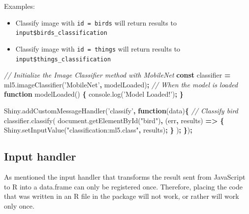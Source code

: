 \documentclass[10pt,]{krantz}
\makeatletter
\newenvironment{Shaded}{\begin{snugshade}}{\end{snugshade}}
\newcommand{\AttributeTok}[1]{\textcolor[rgb]{0.61,0.61,0.61}{#1}}
\newcommand{\CommentTok}[1]{\textcolor[rgb]{0.37,0.37,0.37}{\textit{#1}}}
\newcommand{\KeywordTok}[1]{\textcolor[rgb]{0.27,0.27,0.27}{\textbf{#1}}}
\newcommand{\NormalTok}[1]{#1}
\newcommand{\OperatorTok}[1]{\textcolor[rgb]{0.43,0.43,0.43}{\textbf{#1}}}
\newcommand{\StringTok}[1]{\textcolor[rgb]{0.5,0.5,0.5}{#1}}
\newcommand{\VariableTok}[1]{\textcolor[rgb]{0,0,0}{#1}}
\providecommand{\tightlist}{%
  \setlength{\itemsep}{0pt}\setlength{\parskip}{0pt}}
\newenvironment{kframe}{%
\medskip{}
\setlength{\fboxsep}{.8em}
 \def\at@end@of@kframe{}%
 \ifinner\ifhmode%
  \def\at@end@of@kframe{\end{minipage}}%
  \begin{minipage}{\columnwidth}%
 \fi\fi%
 \def\FrameCommand##1{\hskip\@totalleftmargin \hskip-\fboxsep
 \colorbox{shadecolor}{##1}\hskip-\fboxsep
     \hskip-\linewidth \hskip-\@totalleftmargin \hskip\columnwidth}%
 \MakeFramed {\advance\hsize-\width
   \@totalleftmargin\z@ \linewidth\hsize
   \@setminipage}}%
 {\par\unskip\endMakeFramed%
 \at@end@of@kframe}
\renewenvironment{Shaded}{\begin{kframe}}{\end{kframe}}
\makeatother
\begin{document}
Examples:

\begin{itemize}
\tightlist
\item
  Classify image with \texttt{id\ =\ \textquotesingle{}birds\textquotesingle{}} will return results to \texttt{input\$birds\_classification}
\item
  Classify image with \texttt{id\ =\ \textquotesingle{}things\textquotesingle{}} will return results to \texttt{input\$things\_classification}
\end{itemize}

\begin{Shaded}
\begin{Highlighting}[]
\CommentTok{// Initialize the Image Classifier method with MobileNet}
\KeywordTok{const}\NormalTok{ classifier }\OperatorTok{=} \VariableTok{ml5}\NormalTok{.}\AttributeTok{imageClassifier}\NormalTok{(}\StringTok{'MobileNet'}\OperatorTok{,}\NormalTok{ modelLoaded)}\OperatorTok{;}
\CommentTok{// When the model is loaded}
\KeywordTok{function} \AttributeTok{modelLoaded}\NormalTok{() }\OperatorTok{\{}
  \VariableTok{console}\NormalTok{.}\AttributeTok{log}\NormalTok{(}\StringTok{'Model Loaded!'}\NormalTok{)}\OperatorTok{;}
\OperatorTok{\}}

\VariableTok{Shiny}\NormalTok{.}\AttributeTok{addCustomMessageHandler}\NormalTok{(}\StringTok{'classify'}\OperatorTok{,} \KeywordTok{function}\NormalTok{(data)}\OperatorTok{\{}
  \CommentTok{// Classify bird}
  \VariableTok{classifier}\NormalTok{.}\AttributeTok{classify}\NormalTok{(}
    \VariableTok{document}\NormalTok{.}\AttributeTok{getElementById}\NormalTok{(}\StringTok{"bird"}\NormalTok{)}\OperatorTok{,}\NormalTok{ (err}\OperatorTok{,}\NormalTok{ results) }\KeywordTok{=>} \OperatorTok{\{}
      \VariableTok{Shiny}\NormalTok{.}\AttributeTok{setInputValue}\NormalTok{(}\StringTok{"classification:ml5.class"}\OperatorTok{,}\NormalTok{ results)}\OperatorTok{;}
    \OperatorTok{\}}
\NormalTok{  )}\OperatorTok{;}
\OperatorTok{\}}\NormalTok{)}\OperatorTok{;}
\end{Highlighting}
\end{Shaded}

\hypertarget{shiny-complete-pkg-input-handler}{%
\subsection{Input handler}\label{shiny-complete-pkg-input-handler}}

As mentioned the input handler that transforms the result sent from JavaScript to R into a data.frame can only be registered once. Therefore, placing the code that was written in an R file in the package will not work, or rather will work only once.
\end{document}
